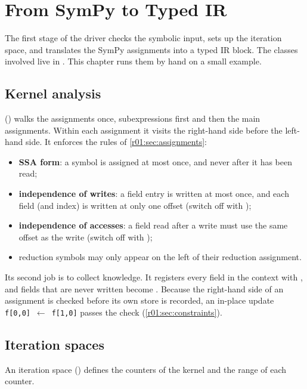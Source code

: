 \chapter{From SymPy to Typed IR}\label{r01:ch:translation}

The first stage of the driver checks the symbolic input, sets up the iteration space,
and translates the SymPy assignments into a typed IR block. The classes involved live in
. This chapter runs them by hand on a small example.

\section{Kernel analysis}\label{r01:sec:analysis}

 () walks the assignments once, subexpressions
first and then the main assignments. Within each assignment it visits the right-hand
side before the left-hand side. It enforces the rules of \cref{r01:sec:assignments}:
\begin{itemize}
  \item \textbf{SSA form}: a symbol is assigned at most once, and never after it has been
        read;
  \item \textbf{independence of writes}: a field entry is written at most once, and
        each field (and index) is written at only one offset (switch off with
        );
  \item \textbf{independence of accesses}: a field read after a write must use the same
        offset as the write (switch off with );
  \item reduction symbols may only appear on the left of their reduction assignment.
\end{itemize}
Its second job is to collect knowledge. It registers every field in the context with
, and fields that are never written become
. Because the right-hand side of an assignment is checked before its own
store is recorded, an in-place update \texttt{f[0,0]}~$\leftarrow$~\texttt{f[1,0]} passes the check
(\cref{r01:sec:constraints}).

\section{Iteration spaces}\label{r01:sec:ispace}

An iteration space () defines the counters of the kernel and
the range of each counter.

